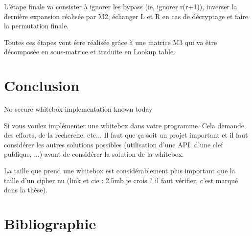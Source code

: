 \documentclass[a4paper,12pt]{article}
\begin{document}
L'étape finale va consister à ignorer les bypass (ie, ignorer r(r+1)), inverser la dernière expansion réalisée par M2, échanger L et R en cas de décryptage et faire la permutation finale.

Toutes ces étapes vont être réalisée grâce à une matrice M3 qui va être décomposée en sous-matrice et traduite en Lookup table.

\newpage

\section{Conclusion}

No secure whitebox implementation known today

Si vous voulez implémenter une whitebox dans votre programme. Cela demande des efforts, de la recherche, etc... Il faut que ça soit un projet important et il faut considérer les autres solutions possibles (utilisation d'une API, d'une clef publique, ...) avant de considérer la solution de la whitebox.

La taille que prend une whitebox est considérablement plus important que la taille d'un cipher nu (link et cie : 2.5mb je crois ? il faut vérifier, c'est marqué dans la thèse).

\newpage

\section{Bibliographie}
\end{document}
